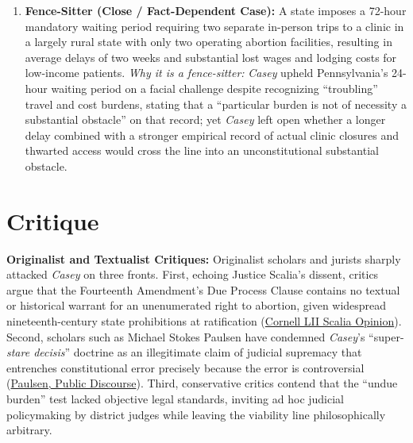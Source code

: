 \documentclass[12pt]{article}
\begin{document}
\begin{enumerate}
\item \textbf{Fence-Sitter (Close / Fact-Dependent Case):} A state imposes a 72-hour mandatory waiting period requiring two separate in-person trips to a clinic in a largely rural state with only two operating abortion facilities, resulting in average delays of two weeks and substantial lost wages and lodging costs for low-income patients. \textit{Why it is a fence-sitter:} \textit{Casey} upheld Pennsylvania's 24-hour waiting period on a facial challenge despite recognizing ``troubling'' travel and cost burdens, stating that a ``particular burden is not of necessity a substantial obstacle'' on that record; yet \textit{Casey} left open whether a longer delay combined with a stronger empirical record of actual clinic closures and thwarted access would cross the line into an unconstitutional substantial obstacle.
\end{enumerate}

\section{Critique}

\textbf{Originalist and Textualist Critiques:} Originalist scholars and jurists sharply attacked \textit{Casey} on three fronts. First, echoing Justice Scalia's dissent, critics argue that the Fourteenth Amendment's Due Process Clause contains no textual or historical warrant for an unenumerated right to abortion, given widespread nineteenth-century state prohibitions at ratification (\href{https://www.law.cornell.edu/supct/html/91-744.ZX4.html}{Cornell LII Scalia Opinion}). Second, scholars such as Michael Stokes Paulsen have condemned \textit{Casey}'s ``super-\textit{stare decisis}'' doctrine as an illegitimate claim of judicial supremacy that entrenches constitutional error precisely because the error is controversial (\href{https://www.thepublicdiscourse.com/2012/06/5772/}{Paulsen, Public Discourse}). Third, conservative critics contend that the ``undue burden'' test lacked objective legal standards, inviting ad hoc judicial policymaking by district judges while leaving the viability line philosophically arbitrary.
\end{document}

